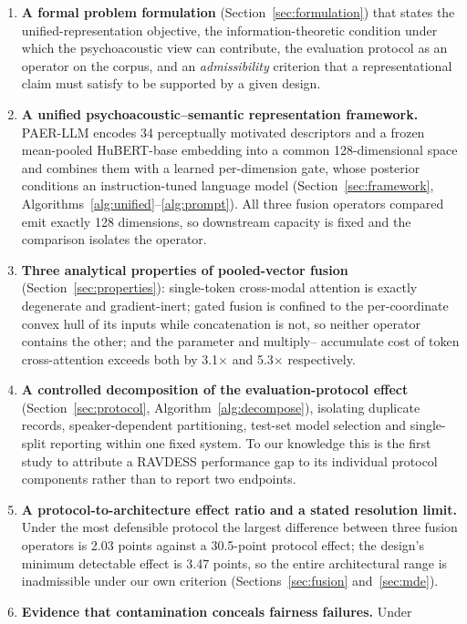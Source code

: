 \documentclass[journal,onecolumn,11pt,draftclsnofoot]{IEEEtran}   %
\begin{document}
\begin{enumerate}
  \item \textbf{A formal problem formulation}
    (Section~\ref{sec:formulation}) that states the unified-representation
    objective, the information-theoretic condition under which the
    psychoacoustic view can contribute, the evaluation protocol as an operator
    on the corpus, and an \emph{admissibility} criterion that a representational
    claim must satisfy to be supported by a given design.
  \item \textbf{A unified psychoacoustic--semantic representation framework.}
    PAER-LLM encodes 34 perceptually motivated descriptors and a frozen
    mean-pooled HuBERT-base embedding into a common 128-dimensional space and
    combines them with a learned per-dimension gate, whose posterior conditions
    an instruction-tuned language model (Section~\ref{sec:framework},
    Algorithms~\ref{alg:unified}--\ref{alg:prompt}). All three fusion operators
    compared emit exactly 128 dimensions, so downstream capacity is fixed and
    the comparison isolates the operator.
  \item \textbf{Three analytical properties of pooled-vector fusion}
    (Section~\ref{sec:properties}): single-token cross-modal attention is
    exactly degenerate and gradient-inert; gated fusion is confined to the
    per-coordinate convex hull of its inputs while concatenation is not, so
    neither operator contains the other; and the parameter and multiply--
    accumulate cost of token cross-attention exceeds both by 3.1$\times$ and
    5.3$\times$ respectively.
  \item \textbf{A controlled decomposition of the evaluation-protocol effect}
    (Section~\ref{sec:protocol}, Algorithm~\ref{alg:decompose}), isolating
    duplicate records, speaker-dependent partitioning, test-set model selection
    and single-split reporting within one fixed system. To our knowledge this is
    the first study to attribute a RAVDESS performance gap to its individual
    protocol components rather than to report two endpoints.
  \item \textbf{A protocol-to-architecture effect ratio and a stated resolution
    limit.} Under the most defensible protocol the largest difference between
    three fusion operators is 2.03 points against a 30.5-point protocol effect;
    the design's minimum detectable effect is 3.47 points, so the entire
    architectural range is inadmissible under our own criterion
    (Sections~\ref{sec:fusion} and~\ref{sec:mde}).
  \item \textbf{Evidence that contamination conceals fairness failures.} Under

\end{enumerate}
\end{document}

